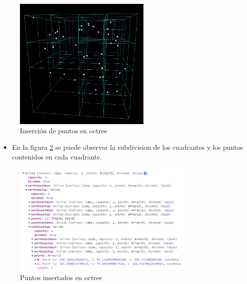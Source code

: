 \documentclass{article}
\begin{document}
\begin{figure}[htbp]
\centering
\includegraphics[width=0.6\textwidth]{img/octree_insert.png}
\caption{Inserción de puntos en octree}
\label{fig:octree_insert}
\end{figure}

\begin{itemize}
\item En la figura \ref{fig:octree_insert_data} se puede observar la subdivision de los cuadrantes y los puntos contenidos en cada cuadrante.
\end{itemize}

\begin{figure}[htbp]
\centering
\includegraphics[width=0.8\textwidth]{img/octree_insert_data.png}
\caption{Puntos insertados en octree}
\label{fig:octree_insert_data}
\end{figure}
  
\end{document}
